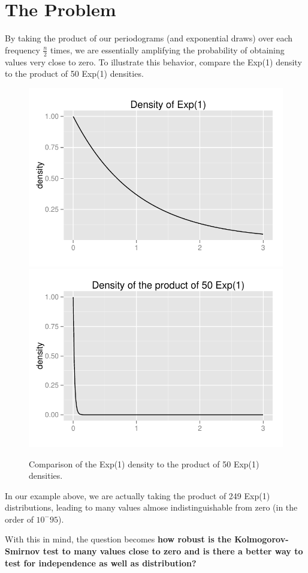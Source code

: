 \documentclass{article}\usepackage[]{graphicx}\usepackage[]{color}
\newenvironment{knitrout}{}{} %
\theoremstyle{plain}
\begin{document}
\section*{The Problem}
By taking the product of our periodograms (and exponential draws) over each frequency $\frac{n}{2}$ times, we are essentially amplifying the probability of obtaining values very close to zero. To illustrate this behavior, compare the Exp(1) density to the product of 50 Exp(1) densities.
\begin{knitrout}
\color{fgcolor}\begin{figure}[H]

\includegraphics[width=.49\textwidth]{figure/density1} 
\includegraphics[width=.49\textwidth]{figure/density2} \caption[Comparison of the Exp(1) density to the product of 50 Exp(1) densities]{Comparison of the Exp(1) density to the product of 50 Exp(1) densities.\label{fig:density}}
\end{figure}


\end{knitrout}

In our example above, we are actually taking the product of 249 Exp(1) distributions, leading to many values almose indistinguishable from zero (in the order of $10^-95$).

With this in mind, the question becomes {\bf how robust is the Kolmogorov-Smirnov test to many values close to zero and is there a better way to test for independence as well as distribution?}
\end{document}
